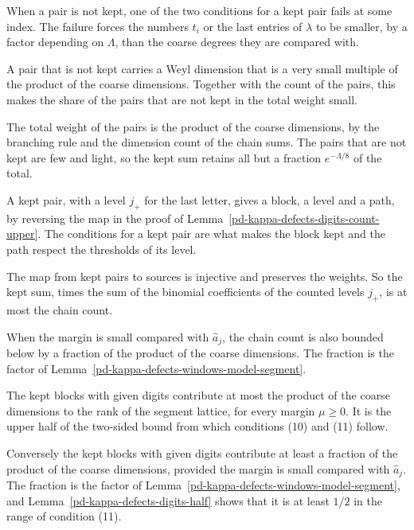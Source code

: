 When a pair is not kept, one of the two conditions for a kept pair fails at some index. The failure forces the numbers
$t_i$ or the last entries of $\lambda$ to be smaller, by a factor depending on $\Lambda$, than the coarse degrees they are
compared with.

A pair that is not kept carries a Weyl dimension that is a very small multiple of the product of the coarse dimensions.
Together with the count of the pairs, this makes the share of the pairs that are not kept in the total weight small.

The total weight of the pairs is the product of the coarse dimensions, by the branching rule and the dimension count of
the chain sums. The pairs that are not kept are few and light, so the kept sum retains all but a fraction
$e^{-\Lambda/8}$ of the total.

A kept pair, with a level $j_+$ for the last letter, gives a block, a level and a path, by reversing the map in the proof
of Lemma~\ref{pd-kappa-defects-digits-count-upper}. The conditions for a kept pair are what makes the block kept and the
path respect the thresholds of its level.

The map from kept pairs to sources is injective and preserves the weights. So the kept sum, times the sum of the
binomial coefficients of the counted levels $j_+$, is at most the chain count.

When the margin is small compared with $\hat a_j$, the chain count is also bounded below by a fraction of
the product of the coarse dimensions. The fraction is the factor of
Lemma~\ref{pd-kappa-defects-windows-model-segment}.

The kept blocks with given digits contribute at most the product of the coarse dimensions to the rank of
the segment lattice, for every margin $\mu\geq0$. It is the upper half of the two-sided bound from which
conditions (10) and (11) follow.

Conversely the kept blocks with given digits contribute at least a fraction of the product of the coarse
dimensions, provided the margin is small compared with $\hat a_j$. The fraction is the factor of
Lemma~\ref{pd-kappa-defects-windows-model-segment}, and Lemma~\ref{pd-kappa-defects-digits-half} shows
that it is at least $1/2$ in the range of condition (11).

